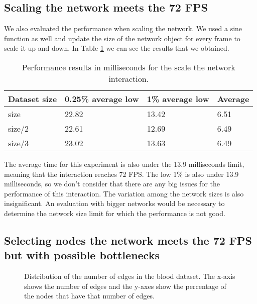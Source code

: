 \subsection{Scaling the network meets the 72 FPS}
We also evaluated the performance when scaling the network. We used a sine function as well and update the size of the network object for every frame to scale it up and down. In Table \ref{tab:experiment_scale} we can see the results that we obtained.

\begin{table}[h!]
\centering
\begin{tabular}{llll}
\hline
Dataset size & 0.25\% average low & 1\% average low & Average \\
\hline
size & 22.82 & 13.42 & 6.51 \\
size/2 & 22.61 & 12.69 & 6.49 \\
size/3 & 23.02 & 13.63 & 6.49 \\
\end{tabular}
\caption{Performance results in milliseconds for the scale the network interaction.}
\label{tab:experiment_scale}
\end{table}

The average time for this experiment is also under the 13.9 milliseconds limit, meaning that the interaction reaches 72 FPS. The low 1\% is also under 13.9 milliseconds, so we don't consider that there are any big issues for the performance of this interaction. The variation among the network sizes is also insignificant. An evaluation with bigger networks would be necessary to determine the network size limit for which the performance is not good.

\subsection{Selecting nodes the network meets the 72 FPS but with possible bottlenecks}

\begin{figure}[h!]
  \centering
  \begin{minipage}{.8\textwidth}
  \end{minipage}
  \caption{Distribution of the number of edges in the blood dataset. The x-axis shows the number of edges and the y-axes show the percentage of the nodes that have that number of edges.}
  \label{fig:edges_nodes_blood}
\end{figure}


